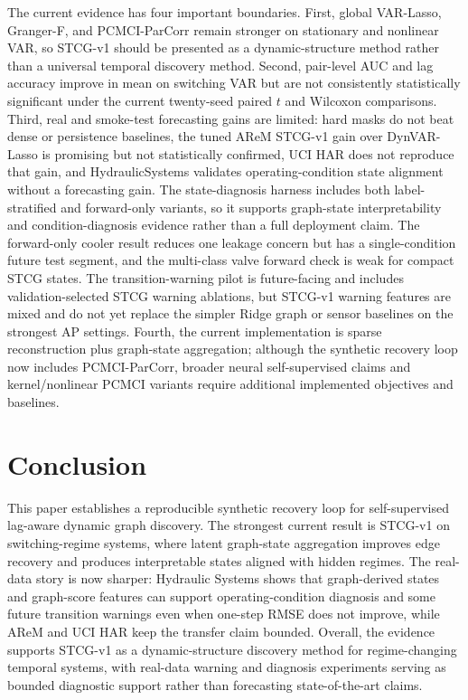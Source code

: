 \documentclass[sigconf,review,anonymous]{acmart}
\begin{document}
The current evidence has four important boundaries.
First, global VAR-Lasso, Granger-F, and PCMCI-ParCorr remain stronger on stationary and nonlinear VAR, so STCG-v1 should be presented as a dynamic-structure method rather than a universal temporal discovery method.
Second, pair-level AUC and lag accuracy improve in mean on switching VAR but are not consistently statistically significant under the current twenty-seed paired $t$ and Wilcoxon comparisons.
Third, real and smoke-test forecasting gains are limited: hard masks do not beat dense or persistence baselines, the tuned AReM STCG-v1 gain over DynVAR-Lasso is promising but not statistically confirmed, UCI HAR does not reproduce that gain, and HydraulicSystems validates operating-condition state alignment without a forecasting gain.
The state-diagnosis harness includes both label-stratified and forward-only variants, so it supports graph-state interpretability and condition-diagnosis evidence rather than a full deployment claim.
The forward-only cooler result reduces one leakage concern but has a single-condition future test segment, and the multi-class valve forward check is weak for compact STCG states.
The transition-warning pilot is future-facing and includes validation-selected STCG warning ablations, but STCG-v1 warning features are mixed and do not yet replace the simpler Ridge graph or sensor baselines on the strongest AP settings.
Fourth, the current implementation is sparse reconstruction plus graph-state aggregation; although the synthetic recovery loop now includes PCMCI-ParCorr, broader neural self-supervised claims and kernel/nonlinear PCMCI variants require additional implemented objectives and baselines.

\section{Conclusion}

This paper establishes a reproducible synthetic recovery loop for self-supervised lag-aware dynamic graph discovery.
The strongest current result is STCG-v1 on switching-regime systems, where latent graph-state aggregation improves edge recovery and produces interpretable states aligned with hidden regimes.
The real-data story is now sharper: Hydraulic Systems shows that graph-derived states and graph-score features can support operating-condition diagnosis and some future transition warnings even when one-step RMSE does not improve, while AReM and UCI HAR keep the transfer claim bounded.
Overall, the evidence supports STCG-v1 as a dynamic-structure discovery method for regime-changing temporal systems, with real-data warning and diagnosis experiments serving as bounded diagnostic support rather than forecasting state-of-the-art claims.
\end{document}
